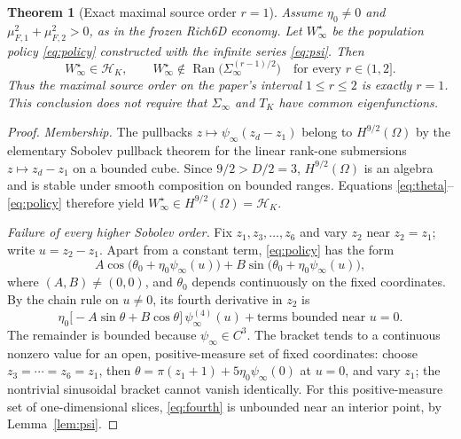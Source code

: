 \documentclass[11pt,a4paper]{article}
\newtheorem{theorem}{Theorem}[section]
\theoremstyle{remark}
\newcommand{\Hh}{\mathcal H_K}
\newcommand{\Ran}{\operatorname{Ran}}
\begin{document}
\begin{theorem}[\texorpdfstring{Exact maximal source order $r=1$}{Exact maximal source order r=1}]\label{thm:exact}
Assume $\eta_0\ne0$ and $\mu_{F,1}^2+\mu_{F,2}^2>0$, as in the frozen Rich6D economy. Let $W_\infty^\star$ be the population policy \eqref{eq:policy} constructed with the infinite series \eqref{eq:psi}. Then
\begin{equation}\label{eq:maxsource}
 W_\infty^\star\in\Hh,
 \qquad W_\infty^\star\notin\Ran\bigl(\Sigma_\infty^{(r-1)/2}\bigr)
 \quad\text{for every }r\in(1,2].
\end{equation}
Thus the maximal source order on the paper's interval $1\le r\le2$ is exactly $r=1$. This conclusion does not require that $\Sigma_\infty$ and $T_K$ have common eigenfunctions.
\end{theorem}
\begin{proof}
\textit{Membership.} The pullbacks $z\mapsto\psi_\infty(z_d-z_1)$ belong to $H^{9/2}(\Omega)$ by the elementary Sobolev pullback theorem for the linear rank-one submersions $z\mapsto z_d-z_1$ on a bounded cube. Since $9/2>D/2=3$, $H^{9/2}(\Omega)$ is an algebra and is stable under smooth composition on bounded ranges. Equations \eqref{eq:theta}--\eqref{eq:policy} therefore yield $W_\infty^\star\in H^{9/2}(\Omega)=\Hh$.

\textit{Failure of every higher Sobolev order.} Fix $z_1,z_3,\ldots,z_6$ and vary $z_2$ near $z_2=z_1$; write $u=z_2-z_1$. Apart from a constant term, \eqref{eq:policy} has the form
\begin{equation}
 A\cos\bigl(\theta_0+\eta_0\psi_\infty(u)\bigr)
 +B\sin\bigl(\theta_0+\eta_0\psi_\infty(u)\bigr),
\end{equation}
where $(A,B)\ne(0,0)$, and $\theta_0$ depends continuously on the fixed coordinates. By the chain rule on $u\ne0$, its fourth derivative in $z_2$ is
\begin{equation}\label{eq:fourth}
 \eta_0\bigl[-A\sin\theta+B\cos\theta\bigr]\,
 \psi_\infty^{(4)}(u)+\text{terms bounded near }u=0.
\end{equation}
The remainder is bounded because $\psi_\infty\in C^3$. The bracket tends to a continuous nonzero value for an open, positive-measure set of fixed coordinates: choose $z_3=\cdots=z_6=z_1$, then $\theta=\pi(z_1+1)+5\eta_0\psi_\infty(0)$ at $u=0$, and vary $z_1$; the nontrivial sinusoidal bracket cannot vanish identically. For this positive-measure set of one-dimensional slices, \eqref{eq:fourth} is unbounded near an interior point, by Lemma~\ref{lem:psi}.


\end{proof}
\end{document}
